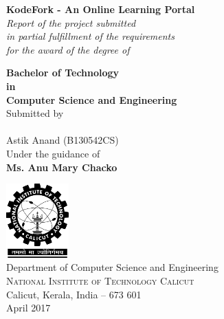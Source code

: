 \begin{titlepage}

\begin{center}

\Large \textbf {KodeFork - An Online Learning Portal}\\[0.5in]

       \small \emph{Report of the project submitted\\
       in partial fulfillment of the requirements\\ for the award of the degree of}
        \vspace{.2in}

       {\bf Bachelor of Technology \\in\\ Computer Science and Engineering}\\[0.5in]


\vspace{.5in}
\normalsize Submitted by \\\\

  Astik Anand (B130542CS)\\


\vspace{.1in}
Under the guidance of\\
{\textbf{Ms. Anu Mary Chacko}}\\[0.2in]

\vfill

\includegraphics[width=0.18\textwidth]{./nitc-logo}\\[0.1in]
\Large{Department of Computer Science and Engineering}\\
\normalsize
\textsc{National Institute of Technology Calicut}\\
Calicut, Kerala, India -- 673 601 \\
\vspace{0.2cm}
April 2017

\end{center}

\end{titlepage}
